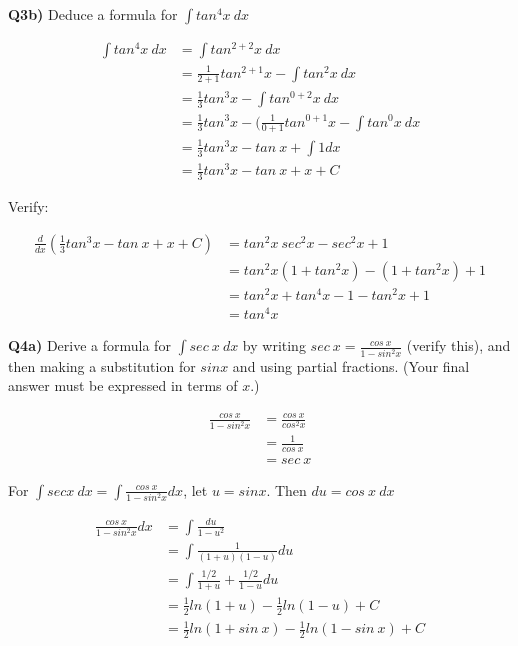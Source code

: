 \documentclass[9pt]{article}
\begin{document}
\begin{tcolorbox}
  \textbf{Q3b)} Deduce a formula for $\int tan^4 x \ dx$
\end{tcolorbox}

\begin{align*}
  \int tan^4 x \ dx &= \int tan^{2+2} x \ dx \\
  &= \frac{1}{2 + 1} tan^{2+1} x - \int tan^2 x \ dx \\
  &= \frac{1}{3} tan^3 x - \int tan^{0+2} x \ dx \\
  &= \frac{1}{3} tan^3 x - (\frac{1}{0+1} tan^{0+1} x - \int tan^0 x \ dx \\
  &= \frac{1}{3} tan^3 x - tan \ x + \int 1 dx \\
  &= \frac{1}{3} tan^3 x - tan \ x + x + C
\end{align*}

Verify:

\begin{align*}
  \frac{d}{dx}(\frac{1}{3} tan^3 x - tan \ x + x + C) &= tan^2 x \ sec^2 x - sec^2 x + 1 \\
  &= tan^2 x (1 + tan^2 x) - (1 + tan^2 x ) + 1 \\
  &= tan^2 x + tan^4 x - 1 - tan^2 x + 1 \\
  &= tan^4 x
\end{align*}


\begin{tcolorbox}
  \textbf{Q4a)} Derive a formula for $\int sec \ x \ dx$ by writing $sec \ x = \frac{cos \ x}{1 - sin^2 x}$ (verify this), and then making a substitution for $sin x$ and using partial fractions. (Your final answer must be expressed in terms of $x$.)
\end{tcolorbox}


\begin{align*}
  \frac{cos \ x}{1 - sin^2 x} &= \frac{cos \ x}{cos^2 x} \\
  &= \frac{1}{cos \ x} \\
  &= sec \ x
\end{align*}

For $\int sec x \ dx = \int \frac{cos \ x}{1 - sin^2 x} dx$, let $u = sin x$. Then $du = cos \ x \ dx$

\begin{align*}
  \frac{cos \ x}{1 - sin^2 x} dx &= \int \frac{du}{1 - u^2} \\
  &= \int \frac{1}{(1 + u)(1 - u)} du \\
  &= \int \frac{1 / 2}{1 + u} + \frac{1 / 2}{1 - u} du \\
  &= \frac{1}{2} ln(1 + u) - \frac{1}{2} ln(1 - u) + C \\
  &= \frac{1}{2} ln(1 + sin \ x) - \frac{1}{2} ln(1 - sin \ x) + C \\
\end{align*}
\end{document}
